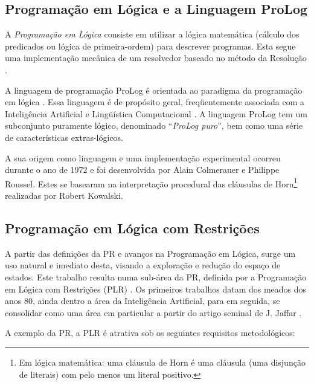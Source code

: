 \documentclass[12pt]{article}
\theoremstyle{definition}
\begin{document}
\subsection{Programação em Lógica e a Linguagem ProLog}

A {\em Programação em Lógica} consiste em utilizar a lógica matemática (cálculo dos predicados ou lógica de primeira-ordem) para descrever programas. Esta segue 
uma implementação mecânica de um resolvedor baseado no método da Resolução \cite{kowalski_linear_71, kowalski_predicate74}.

A linguagem  de programação ProLog é  orientada ao paradigma da  programação
 em lógica \cite{kowalski_1979}. Essa linguagem é de propósito geral, freqüentemente associada  com a Inteligência Artificial e Lingüística
Computacional \cite{covington_89}. A linguagem ProLog tem um subconjunto puramente lógico, denominado ``{\em ProLog puro}'',  bem como uma série de características extras-lógicos.

A sua origem como linguagem e uma  implementação  experimental ocorreu  durante o ano de 1972 e foi desenvolvida por Alain Colmerauer e Philippe Roussel. Estes se 
basearam  na interpretação procedural das cláusulas de Horn\footnote{Em lógica matemática: uma cláusula de Horn é uma cláusula (uma disjunção de literais) com pelo menos um literal positivo.} realizadas por Robert Kowalski.


\subsection{Programação em Lógica com Restrições}

A partir das definições da PR  e avanços na Programação em Lógica, surge um uso natural e imediato desta, visando a exploração e redução do espaço de estados. Este trabalho resulta numa sub-área da PR, definida por a Programação em Lógica com Restrições (PLR) \cite{apt_2003, Marriot_98}.  Os primeiros trabalhos datam dos meados dos anos 80, ainda dentro a área da Inteligência Artificial, para em seguida, se consolidar como uma área em particular a partir do artigo seminal de J. Jaffar \cite{JAFFAR87}.

A exemplo da PR,  a PLR é atrativa sob os seguintes requisitos metodológicos:
\end{document}
